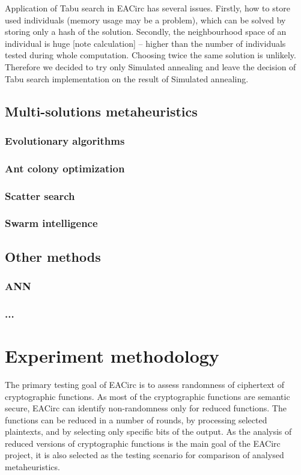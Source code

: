 \documentclass[
  print, %
  Table,   %
  nolof,     %
  nolot,     %
  11pt, %
  oneside  %
]{fithesis3}
\begin{document}
Application of Tabu search in EACirc has several issues. Firstly, how to store used individuals (memory usage may be a problem), which can be solved by storing only a hash of the solution. Secondly, the neighbourhood space of an individual is huge [note calculation] -- higher than the number of individuals tested during whole computation. Choosing twice the same solution is unlikely. Therefore we decided to try only Simulated annealing and leave the decision of Tabu search implementation on the result of Simulated annealing.

\section{Multi-solutions metaheuristics}
\subsection{Evolutionary algorithms}
\subsection{Ant colony optimization}
\subsection{Scatter search}
\subsection{Swarm intelligence}
\section{Other methods}
\subsection{ANN}
\subsection{...}



\chapter{Experiment methodology}

The primary testing goal of EACirc is to assess randomness of ciphertext of cryptographic functions. As most of the cryptographic functions are semantic secure, EACirc can identify non-randomness only for reduced functions. The functions can be reduced in a number of rounds, by processing selected plaintexts, and by selecting only specific bits of the output. As the analysis of reduced versions of cryptographic functions is the main goal of the EACirc project, it is also selected as the testing scenario for comparison of analysed metaheuristics.
\end{document}

